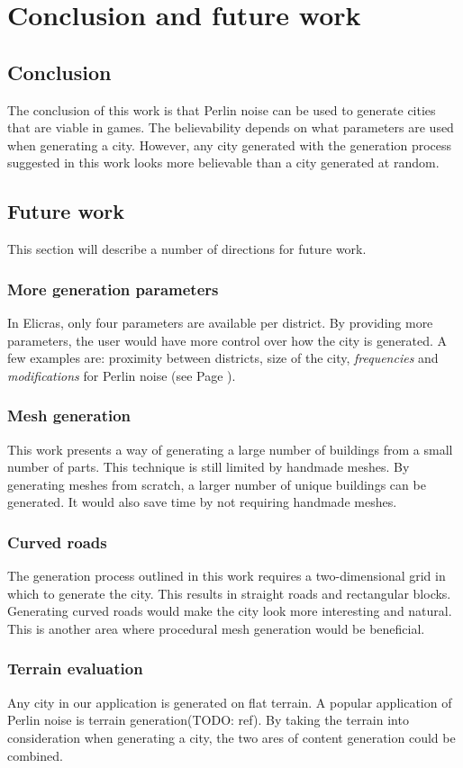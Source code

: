 \section{Conclusion and future work}
	\subsection{Conclusion}
	The conclusion of this work is that Perlin noise can be used to generate cities that are viable in games. The believability depends on what parameters are used when generating a city. However, any city generated with the generation process suggested in this work looks more believable than a city generated at random.
	
	\subsection{Future work}
	This section will describe a number of directions for future work.
	
		\subsubsection{More generation parameters}
		In Elicras, only four parameters are available per district. By providing more parameters, the user would have more control over how the city is generated. A few examples are: proximity between districts, size of the city, \textit{frequencies} and \textit{modifications} for Perlin noise (see Page \pageref{fig:normal-and-modified-perlin}).
	
		\subsubsection{Mesh generation}
		This work presents a way of generating a large number of buildings from a small number of parts. This technique is still limited by handmade meshes. By generating meshes from scratch, a larger number of unique buildings can be generated. It would also save time by not requiring handmade meshes.
		
		\subsubsection{Curved roads}
		The generation process outlined in this work requires a two-dimensional grid in which to generate the city. This results in straight roads and rectangular blocks. Generating curved roads would make the city look more interesting and natural. This is another area where procedural mesh generation would be beneficial.
		
		\subsubsection{Terrain evaluation}
		Any city in our application is generated on flat terrain. A popular application of Perlin noise is terrain generation(TODO: ref). By taking the terrain into consideration when generating a city, the two ares of content generation could be combined.